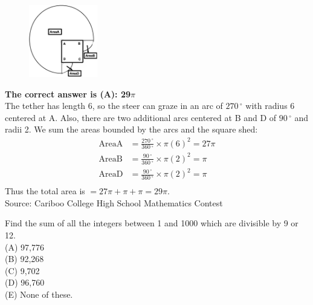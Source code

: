 \documentclass{article}
\begin{document}
\begin{figure}
	\includegraphics[width=30mm]{CCSPR73-23pic2.eps}
\end{figure}

\textbf{The correct answer is (A): 29$\pi$}\\[1 ex]
The tether has length 6, so the steer can graze in an arc of $270\,^{\circ}$ with radius 6 centered at A.  Also, there are two additional arcs centered at B and D of $90\,^{\circ}$ and radii 2.
We sum the areas bounded by the arcs and the square shed:
\begin{align*} 
\textrm{AreaA} &=\frac{270\,^{\circ}}{360\,^{\circ}}\times\pi(6)^2=27\pi\\
\textrm{AreaB} &=\frac{90\,^{\circ}}{360\,^{\circ}}\times\pi(2)^2=\pi\\
\textrm{AreaD} &=\frac{90\,^{\circ}}{360\,^{\circ}}\times\pi(2)^2=\pi\\
\end{align*}
Thus the total area is $=27\pi+\pi+\pi=29\pi$.
\\[5 ex]

\scriptsize
Source: Cariboo College High School Mathematics Contest

\normalsize
Find the sum of all the integers between 1 and 1000 which are divisible by 9 or 12.\\
(A) 97,776\\
(B) 92,268\\
(C) 9,702\\
(D) 96,760\\
(E) None of these.\\

\end{document}
